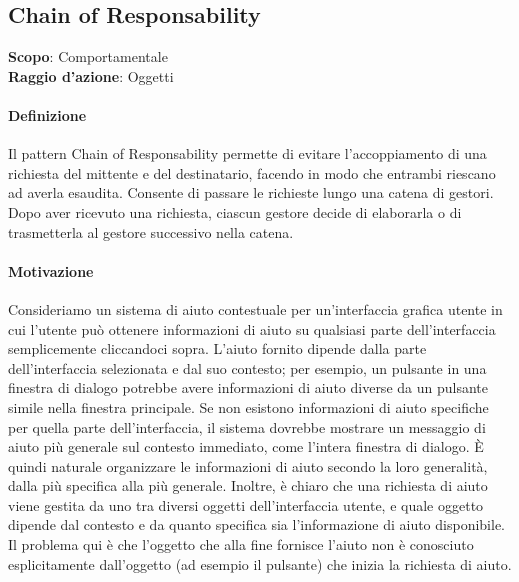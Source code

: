 \subsection{Chain of Responsability}
\label{chain-of-responsability}

\textbf{Scopo}: Comportamentale \\
\textbf{Raggio d'azione}: Oggetti

\paragraph{Definizione} Il pattern Chain of Responsability permette di evitare l'accoppiamento di una richiesta del mittente e del destinatario, facendo in modo che entrambi riescano ad averla esaudita. Consente di passare le richieste lungo una catena di gestori. Dopo aver ricevuto una richiesta, ciascun gestore decide di elaborarla o di trasmetterla al gestore successivo nella catena.

\paragraph{Motivazione} Consideriamo un sistema di aiuto contestuale per un'interfaccia grafica utente in cui l'utente può ottenere informazioni di aiuto su qualsiasi parte dell'interfaccia semplicemente cliccandoci sopra. L'aiuto fornito dipende dalla parte dell'interfaccia selezionata e dal suo contesto; per esempio, un pulsante in una finestra di dialogo potrebbe avere informazioni di aiuto diverse da un pulsante simile nella finestra principale. Se non esistono informazioni di aiuto specifiche per quella parte dell'interfaccia, il sistema dovrebbe mostrare un messaggio di aiuto più generale sul contesto immediato, come l'intera finestra di dialogo. È quindi naturale organizzare le informazioni di aiuto secondo la loro generalità, dalla più specifica alla più generale. Inoltre, è chiaro che una richiesta di aiuto viene gestita da uno tra diversi oggetti dell'interfaccia utente, e quale oggetto dipende dal contesto e da quanto specifica sia l'informazione di aiuto disponibile. Il problema qui è che l'oggetto che alla fine fornisce l'aiuto non è conosciuto esplicitamente dall'oggetto (ad esempio il pulsante) che inizia la richiesta di aiuto.

